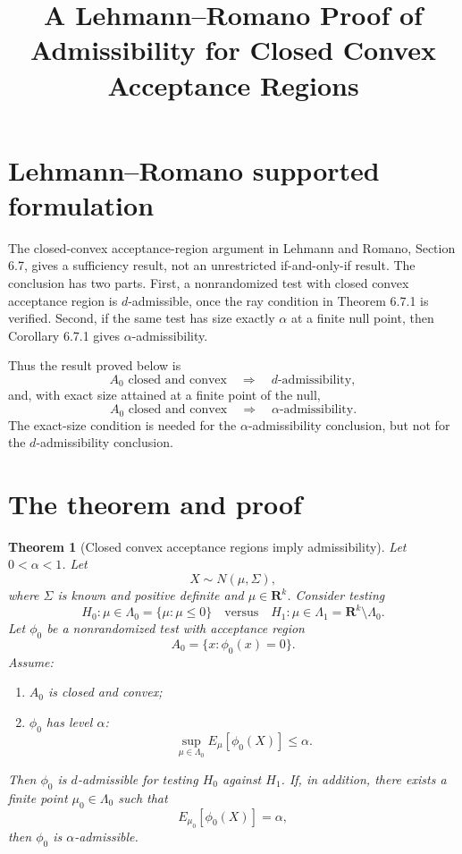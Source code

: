 \documentclass[11pt]{article}
\title{A Lehmann--Romano Proof of Admissibility for Closed Convex Acceptance Regions}
\date{}
\newtheorem{theorem}{Theorem}
\begin{document}
\maketitle

\section{Lehmann--Romano supported formulation}

The closed-convex acceptance-region argument in Lehmann and Romano, Section 6.7, gives a sufficiency result, not an unrestricted if-and-only-if result.  The conclusion has two parts.  First, a nonrandomized test with closed convex acceptance region is $d$-admissible, once the ray condition in Theorem 6.7.1 is verified.  Second, if the same test has size exactly $\alpha$ at a finite null point, then Corollary 6.7.1 gives $\alpha$-admissibility.

Thus the result proved below is
\[
A_0\text{ closed and convex}\quad\Longrightarrow\quad d\text{-admissibility},
\]
and, with exact size attained at a finite point of the null,
\[
A_0\text{ closed and convex}\quad\Longrightarrow\quad \alpha\text{-admissibility}.
\]
The exact-size condition is needed for the $\alpha$-admissibility conclusion, but not for the $d$-admissibility conclusion.

\section{The theorem and proof}

\begin{theorem}[Closed convex acceptance regions imply admissibility]
Let $0<\alpha<1$. Let
\[
X\sim N(\mu,\Sigma),
\]
where $\Sigma$ is known and positive definite and $\mu\in\mathbf R^k$. Consider testing
\[
H_0:\mu\in\Lambda_0=\{\mu:\mu\le 0\}
\quad\text{versus}\quad
H_1:\mu\in\Lambda_1=\mathbf R^k\setminus\Lambda_0.
\]
Let $\phi_0$ be a nonrandomized test with acceptance region
\[
A_0=\{x:\phi_0(x)=0\}.
\]
Assume:
\begin{enumerate}[label=(\roman*)]
\item $A_0$ is closed and convex;
\item $\phi_0$ has level $\alpha$:
\[
\sup_{\mu\in\Lambda_0} E_\mu[\phi_0(X)]\le \alpha.
\]
\end{enumerate}
Then $\phi_0$ is $d$-admissible for testing $H_0$ against $H_1$. If, in addition, there exists a finite point $\mu_0\in\Lambda_0$ such that
\[
E_{\mu_0}[\phi_0(X)]=\alpha,
\]
then $\phi_0$ is $\alpha$-admissible.
\end{theorem}
\end{document}
